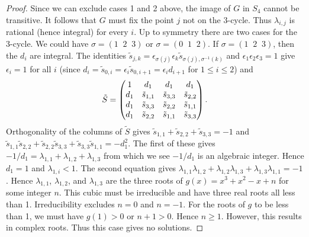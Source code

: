 \documentclass[12pt,psamsfonts]{amsart}
\newcommand{\e}{{\epsilon}}
\numberwithin{equation}{section}
\theoremstyle{definition}
\begin{document}
\begin{proof}
Since we can exclude cases 1 and 2 above, the image of $G$ in
$S_4$ cannot be transitive. It follows that $G$ must fix the point
$j$ not on the 3-cycle. Thus $\lambda_{i,j}$ is rational (hence
integral) for every $i$. Up to symmetry there are two cases for
the 3-cycle. We could have $\sigma=(1\;\; 2\;\; 3)$ or
$\sigma=(0\;\; 1\;\; 2)$. If $\sigma=(1\;\; 2\;\; 3)$, then the
$d_i$ are integral. The identities $\tilde
s_{j,k}=\e_{\sigma(j)}\e_k \tilde s_{\sigma(j),\sigma^{-1}(k)}$
and $\e_1\e_2\e_3=1$ give $\e_i=1$ for all $i$ (since $d_i=\tilde
s_{0,i}=\e_i \tilde s_{0,i+1}=\e_i d_{i+1}$ for $1\le i\le 2$) and
$$\tilde S=\left(\begin{matrix} 1 & d_1 & d_1 & d_1\cr d_1 & \tilde s_{1,1}
& \tilde s_{3,3} & \tilde s_{2,2}\cr d_1 & \tilde s_{3,3} & \tilde
s_{2,2} & \tilde s_{1,1}\cr d_1 & \tilde s_{2,2} & \tilde s_{1,1}
& \tilde s_{3,3}
\end{matrix}\right).$$
Orthogonality of the columns of $\tilde S$ gives $\tilde
s_{1,1}+\tilde s_{2,2}+\tilde s_{3,3}=-1$ and $\tilde
s_{1,1}\tilde s_{2,2}+\tilde s_{2,2}\tilde s_{3,3}+\tilde
s_{3,3}\tilde s_{1,1}=-d_1^2$. The first of these gives
$-1/d_1=\lambda_{1,1}+\lambda_{1,2}+\lambda_{1,3}$ from which we
see $-1/d_1$ is an algebraic integer. Hence $d_1=1$ and
$\lambda_{1,i}<1$. The second equation gives
$\lambda_{1,1}\lambda_{1,2}+
\lambda_{1,2}\lambda_{1,3}+\lambda_{1,3}\lambda_{1,1}=-1$. Hence
$\lambda_{1,1}$, $\lambda_{1,2}$, and $\lambda_{1,3}$ are the
three roots of $g(x)=x^3+x^2-x+n$ for some integer $n$. This cubic
must be irreducible and have three real roots all less than 1.
Irreducibility excludes $n=0$ and $n=-1$. For the roots of $g$ to
be less than 1, we must have $g(1)>0$ or $n+1>0$. Hence $n\ge 1$.
However, this results in complex roots. Thus this case gives no
solutions.


\end{proof}
\end{document}
